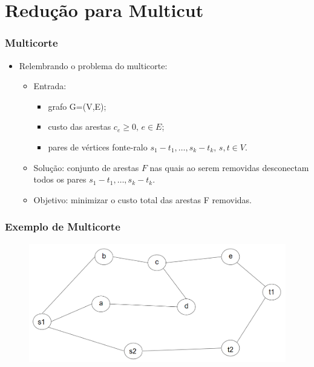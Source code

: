\documentclass[11pt, handout]{beamer}
\begin{document}
\section{Redução para Multicut}
\begin{frame}[<+->]
    \frametitle{Multicorte}
        \begin{itemize}
            \item Relembrando o problema do multicorte:
                \begin{itemize}
                    \item Entrada:
                        \begin{itemize}
                            \item grafo G=(V,E);
                            \item custo das arestas $c_e \ge 0,\, e \in E$;
                            \item pares de vértices fonte-ralo $s_1-t_1, \dots, s_k-t_k,\,s,t \in V$.
                        \end{itemize}
                    \item Solução: conjunto de arestas $F$ nas quais ao serem removidas desconectam todos os pares $s_1-t_1, \dots, s_k-t_k$.
                    \item Objetivo: minimizar o custo total das arestas F removidas.
                \end{itemize}
        \end{itemize}        
\end{frame}{}

\begin{frame}
    \frametitle{Exemplo de Multicorte}
    
    \begin{figure}
        \centering
        \includegraphics[width=1\textwidth]{images/multicutExample.png}
    \end{figure}{}
    
\end{frame}
\end{document}
